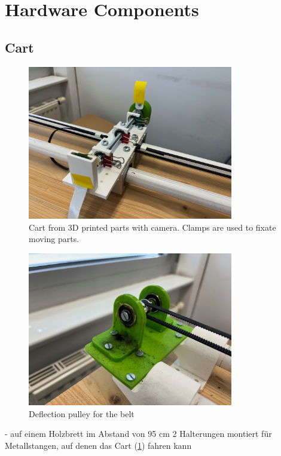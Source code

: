\section{Hardware Components}
\subsection{Cart}
\begin{figure}[htbp]
    \centering
    \includegraphics[width=0.8\textwidth]{img/cart.jpg}
    \caption{Cart from 3D printed parts with camera. Clamps are used to fixate moving parts.}
    \label{fig:cart}
\end{figure}
\begin{figure}[htbp]
    \centering
    \includegraphics[width=0.8\textwidth]{img/deflection_pulley.jpg}
    \caption{Deflection pulley for the belt}
    \label{fig:deflection_pulley}
\end{figure}
- auf einem Holzbrett im Abstand von 95 cm 2 Halterungen montiert für Metallstangen, auf denen das Cart (\ref{fig:cart}) fahren kann
